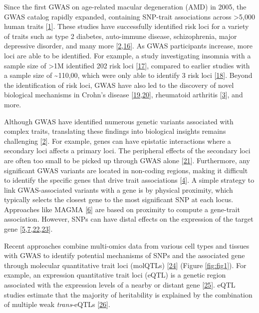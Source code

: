 Since the first GWAS on age-related macular degeneration (AMD) in 2005, the GWAS catalog rapidly expanded, containing SNP-trait associations across \textgreater5,000 human traits {[}\protect\hyperlink{ref-VRCjjZ9L}{1}{]}.
These studies have successfully identified risk loci for a variety of traits such as type 2 diabetes, auto-immune disease, schizophrenia, major depressive disorder, and many more {[}\protect\hyperlink{ref-17B4AigZT}{2},\protect\hyperlink{ref-yqBcaXHD}{16}{]}.
As GWAS participants increase, more loci are able to be identified.
For example, a study investigating insomnia with a sample size of \textgreater1M identified 202 risk loci {[}\protect\hyperlink{ref-sBTrhvlJ}{17}{]}, compared to earlier studies with a sample size of \textasciitilde110,00, which were only able to identify 3 risk loci {[}\protect\hyperlink{ref-crCAymA1}{18}{]}.
Beyond the identification of risk loci, GWAS have also led to the discovery of novel biological mechanisms in Crohn's disease {[}\protect\hyperlink{ref-s6z5ZuY3}{19},\protect\hyperlink{ref-gxwza7fO}{20}{]}, rheumatoid arthritis {[}\protect\hyperlink{ref-HicyXvA4}{3}{]}, and more.

Although GWAS have identified numerous genetic variants associated with complex traits, translating these findings into biological insights remains challenging {[}\protect\hyperlink{ref-17B4AigZT}{2}{]}.
For example, genes can have epistatic interactions where a secondary loci affects a primary loci.
The peripheral effects of the secondary loci are often too small to be picked up through GWAS alone {[}\protect\hyperlink{ref-IrGVpNji}{21}{]}.
Furthermore, any significant GWAS variants are located in non-coding regions, making it difficult to identify the specific genes that drive trait associations {[}\protect\hyperlink{ref-BqjxxhyF}{4}{]}.
A simple strategy to link GWAS-associated variants with a gene is by physical proximity, which typically selects the closest gene to the most significant SNP at each locus.
Approaches like MAGMA {[}\protect\hyperlink{ref-19XiXgYmd}{6}{]} are based on proximity to compute a gene-trait association.
However, SNPs can have distal effects on the expression of the target gene {[}\protect\hyperlink{ref-9Pr9idng}{5},\protect\hyperlink{ref-167QL5tMV}{7},\protect\hyperlink{ref-OBxYzUMh}{22},\protect\hyperlink{ref-WfdUHVDA}{23}{]}.

Recent approaches combine multi-omics data from various cell types and tissues with GWAS to identify potential mechanisms of SNPs and the associated gene through molecular quantitative trait loci (molQTLs) {[}\protect\hyperlink{ref-QIEm5ZWK}{24}{]} (Figure \ref{fig:fig1}).
For example, an expression quantitative trait loci (eQTL) is a genetic region associated with the expression levels of a nearby or distant gene {[}\protect\hyperlink{ref-1FHKg3JK5}{25}{]}.
eQTL studies estimate that the majority of heritability is explained by the combination of multiple weak \emph{trans}-eQTLs {[}\protect\hyperlink{ref-sGgkLsyy}{26}{]}.

